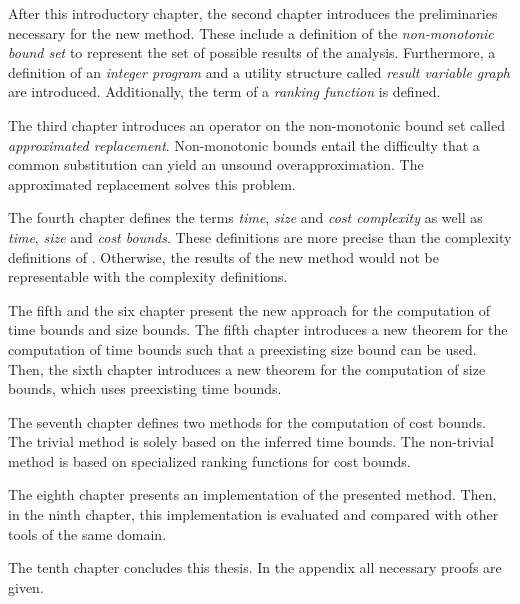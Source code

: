 After this introductory chapter, the second chapter introduces the preliminaries necessary for the new method.
These include a definition of the \emph{non-monotonic bound set} to represent the set of possible results of the analysis.
Furthermore, a definition of an \emph{integer program} and a utility structure called \emph{result variable graph} are introduced.
Additionally, the term of a \emph{ranking function} is defined.

The third chapter introduces an operator on the non-monotonic bound set called \emph{approximated replacement}.
Non-monotonic bounds entail the difficulty that a common substitution can yield an unsound overapproximation.
The approximated replacement solves this problem.

The fourth chapter defines the terms \emph{time}, \emph{size} and \emph{cost complexity} as well as \emph{time}, \emph{size} and \emph{cost bounds}.
These definitions are more precise than the complexity definitions of \cite{koat}.
Otherwise, the results of the new method would not be representable with the complexity definitions.

The fifth and the six chapter present the new approach for the computation of time bounds and size bounds.
The fifth chapter introduces a new theorem for the computation of time bounds such that a preexisting size bound can be used.
Then, the sixth chapter introduces a new theorem for the computation of size bounds, which uses preexisting time bounds.

The seventh chapter defines two methods for the computation of cost bounds.
The trivial method is solely based on the inferred time bounds.
The non-trivial method is based on specialized ranking functions for cost bounds.

The eighth chapter presents an implementation of the presented method.
Then, in the ninth chapter, this implementation is evaluated and compared with other tools of the same domain.

The tenth chapter concludes this thesis.
In the appendix all necessary proofs are given.
